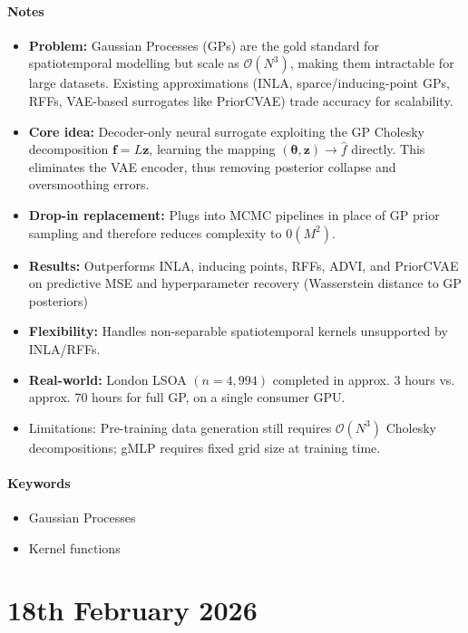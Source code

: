 \documentclass[12pt,a4paper,twoside]{article}
\begin{document}
\begin{paper}
	\paragraph{Notes}
	\begin{itemize}
		\item \textbf{Problem:} Gaussian Processes (GPs) are the gold standard for spatiotemporal modelling but scale as $\mathcal{O}(N^3)$, making them intractable for large datasets. Existing approximations (INLA, sparce/inducing-point GPs, RFFs, VAE-based surrogates like PriorCVAE) trade accuracy for scalability.
		\item \textbf{Core idea:} Decoder-only neural surrogate exploiting the GP Cholesky decomposition $\mathbf{f}=L\mathbf{z}$, learning the mapping $(\mathbf{\theta}, \mathbf{z})\rightarrow \hat{f}$ directly. This eliminates the VAE encoder, thus removing posterior collapse and oversmoothing errors.
		\item \textbf{Drop-in replacement:} Plugs into MCMC pipelines in place of GP prior sampling and therefore reduces complexity to $\mathcal{0}(M^2)$.
		\item \textbf{Results:} Outperforms INLA, inducing points, RFFs, ADVI, and PriorCVAE on predictive MSE and hyperparameter recovery (Wasserstein distance to GP posteriors)
		\item \textbf{Flexibility:} Handles non-separable spatiotemporal kernels unsupported by INLA/RFFs.
		\item \textbf{Real-world:} London LSOA $(n=4,994)$ completed in approx. 3 hours vs. approx. 70 hours for full GP, on a single consumer GPU.
		\item Limitations: Pre-training data generation still requires $\mathcal{O}(N^3)$ Cholesky decompositions; gMLP requires fixed grid size at training time.
	\end{itemize}

	\paragraph{Keywords}
	\begin{itemize}
		\item Gaussian Processes
		\item Kernel functions
	\end{itemize}
\end{paper}

\section{18th February 2026}
\end{document}
